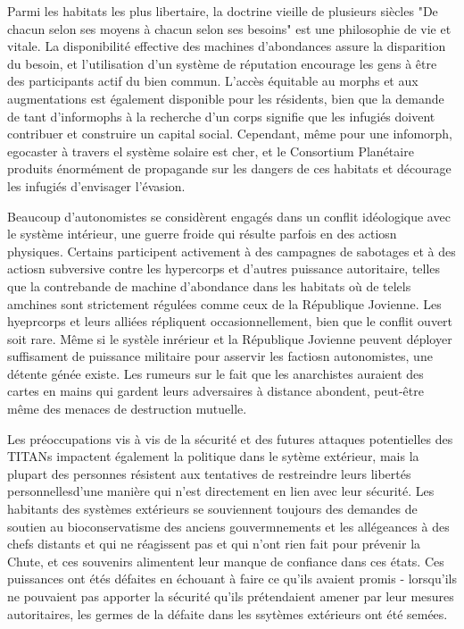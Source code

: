 Parmi les habitats les plus libertaire, la doctrine vieille de plusieurs siècles "De chacun selon ses moyens à chacun selon ses besoins" est une philosophie de vie et vitale. La disponibilité effective des machines d'abondances assure la disparition du besoin, et l'utilisation d'un système de réputation encourage les gens à être des participants actif du bien commun. L'accès équitable au morphs et aux augmentations est également disponible pour les résidents, bien que la demande de tant d'informophs à la recherche d'un corps signifie que les infugiés doivent contribuer et construire un capital social. Cependant, même pour une infomorph, egocaster à travers el système solaire est cher, et le Consortium Planétaire produits énormément de propagande sur les dangers de ces habitats et décourage les infugiés d'envisager l'évasion. 

Beaucoup d'autonomistes se considèrent engagés dans un conflit idéologique avec le système intérieur, une guerre froide qui résulte parfois en des actiosn physiques. Certains participent activement à des campagnes de sabotages et à des actiosn subversive contre les hypercorps et d'autres puissance autoritaire, telles que la contrebande de machine d'abondance dans les habitats où de telels amchines sont strictement régulées comme ceux de la République Jovienne. Les hyeprcorps et leurs alliées répliquent occasionnellement, bien que le conflit ouvert soit rare. Même si le systèle inrérieur et la République Jovienne peuvent déployer suffisament de puissance militaire pour asservir les factiosn autonomistes, une détente génée existe. Les rumeurs sur le fait que les anarchistes auraient des cartes en mains qui gardent leurs adversaires à distance abondent, peut-être même des menaces de destruction mutuelle. 

Les préoccupations vis à vis de la sécurité et des futures attaques potentielles des TITANs impactent également la politique dans le sytème extérieur, mais la plupart des personnes résistent aux tentatives de restreindre leurs libertés personnellesd'une manière qui n'est directement en lien avec leur sécurité. Les habitants des systèmes extérieurs se souviennent toujours des demandes de soutien au bioconservatisme des anciens gouvermnements et les allégeances à des chefs distants et qui ne réagissent pas et qui n'ont rien fait pour prévenir la Chute, et ces souvenirs alimentent leur manque de confiance dans ces états. Ces puissances ont étés défaites en échouant à faire ce qu'ils avaient promis - lorsqu'ils ne pouvaient pas apporter la sécurité qu'ils prétendaient amener par leur mesures autoritaires, les germes de la défaite dans les ssytèmes extérieurs ont été semées. 

